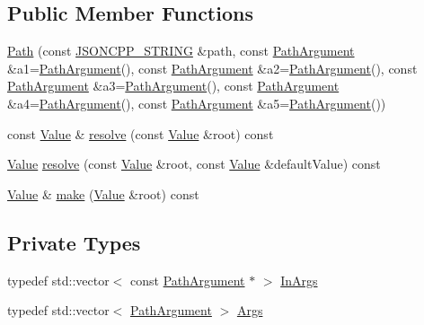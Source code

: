 \subsection*{Public Member Functions}
\begin{DoxyCompactItemize}
\item 
\hyperlink{class_json_1_1_path_a7356c0e9c1fc2276390fd396271c1300}{Path} (const \hyperlink{json_8h_a1e723f95759de062585bc4a8fd3fa4be}{J\+S\+O\+N\+C\+P\+P\+\_\+\+S\+T\+R\+I\+NG} \&path, const \hyperlink{class_json_1_1_path_argument}{Path\+Argument} \&a1=\hyperlink{class_json_1_1_path_argument}{Path\+Argument}(), const \hyperlink{class_json_1_1_path_argument}{Path\+Argument} \&a2=\hyperlink{class_json_1_1_path_argument}{Path\+Argument}(), const \hyperlink{class_json_1_1_path_argument}{Path\+Argument} \&a3=\hyperlink{class_json_1_1_path_argument}{Path\+Argument}(), const \hyperlink{class_json_1_1_path_argument}{Path\+Argument} \&a4=\hyperlink{class_json_1_1_path_argument}{Path\+Argument}(), const \hyperlink{class_json_1_1_path_argument}{Path\+Argument} \&a5=\hyperlink{class_json_1_1_path_argument}{Path\+Argument}())
\item 
const \hyperlink{class_json_1_1_value}{Value} \& \hyperlink{class_json_1_1_path_ad1abdc54d2e03fc0e9436c3b9fd55a33}{resolve} (const \hyperlink{class_json_1_1_value}{Value} \&root) const
\item 
\hyperlink{class_json_1_1_value}{Value} \hyperlink{class_json_1_1_path_ab65ab001ccdbc6f8b5f123da58b92539}{resolve} (const \hyperlink{class_json_1_1_value}{Value} \&root, const \hyperlink{class_json_1_1_value}{Value} \&default\+Value) const
\item 
\hyperlink{class_json_1_1_value}{Value} \& \hyperlink{class_json_1_1_path_a858f9426f0f7bbe0450644d72b44e26b}{make} (\hyperlink{class_json_1_1_value}{Value} \&root) const
\end{DoxyCompactItemize}
\subsection*{Private Types}
\begin{DoxyCompactItemize}
\item 
typedef std\+::vector$<$ const \hyperlink{class_json_1_1_path_argument}{Path\+Argument} $\ast$ $>$ \hyperlink{class_json_1_1_path_ab29d7b2fc896c7d3c5ed4609af3a3f23}{In\+Args}
\item 
typedef std\+::vector$<$ \hyperlink{class_json_1_1_path_argument}{Path\+Argument} $>$ \hyperlink{class_json_1_1_path_a27d96232d034d7a78286468676f9cb3e}{Args}
\end{DoxyCompactItemize}
